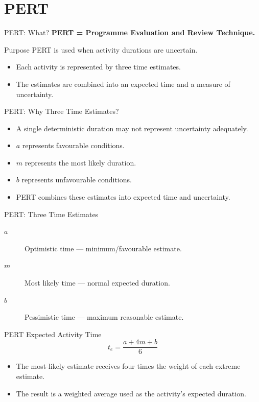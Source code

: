 \documentclass[aspectratio=169,10pt]{beamer}
\begin{document}
\section{PERT}

\begin{frame}{PERT: What?}
\textbf{PERT = Programme Evaluation and Review Technique.}
\begin{block}{Purpose}
PERT is used when activity durations are uncertain.
\end{block}
\begin{itemize}
  \item Each activity is represented by three time estimates.
  \item The estimates are combined into an expected time and a measure of uncertainty.
\end{itemize}
\end{frame}

\begin{frame}{PERT: Why Three Time Estimates?}
\begin{itemize}
  \item A single deterministic duration may not represent uncertainty adequately.
  \item $a$ represents favourable conditions.
  \item $m$ represents the most likely duration.
  \item $b$ represents unfavourable conditions.
  \item PERT combines these estimates into expected time and uncertainty.
\end{itemize}
\end{frame}

\begin{frame}{PERT: Three Time Estimates}
\begin{description}
\item[$a$] Optimistic time — minimum/favourable estimate.
\item[$m$] Most likely time — normal expected duration.
\item[$b$] Pessimistic time — maximum reasonable estimate.
\end{description}
\end{frame}

\begin{frame}{PERT Expected Activity Time}
\[
\boxed{t_e=\frac{a+4m+b}{6}}
\]
\begin{itemize}
  \item The most-likely estimate receives four times the weight of each extreme estimate.
  \item The result is a weighted average used as the activity's expected duration.
\end{itemize}
\end{frame}
\end{document}
